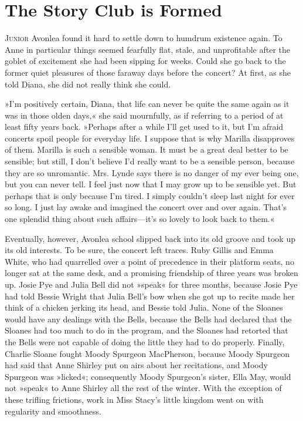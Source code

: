 \chapter{The Story Club is Formed}

\lettrine[lines=4]{J}{unior} Avonlea found it hard to settle down to humdrum existence again. To Anne in particular things seemed fearfully flat, stale, and unprofitable after the goblet of excitement she had been sipping for weeks. Could she go back to the former quiet pleasures of those faraway days before the concert? At first, as she told Diana, she did not really think she could.

»I’m positively certain, Diana, that life can never be quite the same again as it was in those olden days,« she said mournfully, as if referring to a period of at least fifty years back. »Perhaps after a while I’ll get used to it, but I’m afraid concerts spoil people for everyday life. I suppose that is why Marilla disapproves of them. Marilla is such a sensible woman. It must be a great deal better to be sensible; but still, I don’t believe I’d really want to be a sensible person, because they are so unromantic. Mrs. Lynde says there is no danger of my ever being one, but you can never tell. I feel just now that I may grow up to be sensible yet. But perhaps that is only because I’m tired. I simply couldn’t sleep last night for ever so long. I just lay awake and imagined the concert over and over again. That’s one splendid thing about such affairs—it’s so lovely to look back to them.«

Eventually, however, Avonlea school slipped back into its old groove and took up its old interests. To be sure, the concert left traces. Ruby Gillis and Emma White, who had quarrelled over a point of precedence in their platform seats, no longer sat at the same desk, and a promising friendship of three years was broken up. Josie Pye and Julia Bell did not »speak« for three months, because Josie Pye had told Bessie Wright that Julia Bell’s bow when she got up to recite made her think of a chicken jerking its head, and Bessie told Julia. None of the Sloanes would have any dealings with the Bells, because the Bells had declared that the Sloanes had too much to do in the program, and the Sloanes had retorted that the Bells were not capable of doing the little they had to do properly. Finally, Charlie Sloane fought Moody Spurgeon MacPherson, because Moody Spurgeon had said that Anne Shirley put on airs about her recitations, and Moody Spurgeon was »licked«; consequently Moody Spurgeon’s sister, Ella May, would not »speak« to Anne Shirley all the rest of the winter. With the exception of these trifling frictions, work in Miss Stacy’s little kingdom went on with regularity and smoothness.

